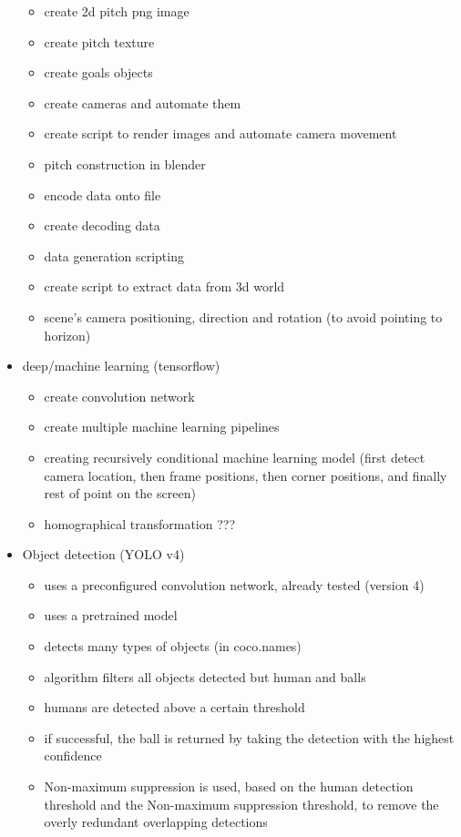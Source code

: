 \documentclass[
11pt,
twoside
]{report}
\begin{document}
\begin{itemize}
  \begin{itemize}
  \item
    create 2d pitch png image
  \item
    create pitch texture
  \item
    create goals objects
  \item
    create cameras and automate them
  \item
    create script to render images and automate camera movement
  \item
    pitch construction in blender
  \item
    encode data onto file
  \item
    create decoding data
  \item
    data generation scripting
  \item
    create script to extract data from 3d world
  \item
    scene's camera positioning, direction and rotation (to avoid
    pointing to horizon)
  \end{itemize}
\item
  deep/machine learning (tensorflow)

  \begin{itemize}
  \item
    create convolution network
  \item
    create multiple machine learning pipelines
  \item
    creating recursively conditional machine learning model (first
    detect camera location, then frame positions, then corner positions,
    and finally rest of point on the screen)
  \item
    homographical transformation ???
  \end{itemize}
\item
  Object detection (YOLO v4)

  \begin{itemize}
  \item
    uses a preconfigured convolution network, already tested (version 4)
  \item
    uses a pretrained model
  \item
    detects many types of objects (in coco.names)
  \item
    algorithm filters all objects detected but human and balls
  \item
    humans are detected above a certain threshold
  \item
    if successful, the ball is returned by taking the detection with the
    highest confidence
  \item
    Non-maximum suppression is used, based on the human detection
    threshold and the Non-maximum suppression threshold, to remove the
    overly redundant overlapping detections
  \end{itemize}


\end{itemize}
\end{document}
